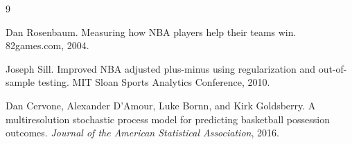 \documentclass[11pt]{article}
\begin{document}
\begin{thebibliography}{9}

Dan Rosenbaum.
\newblock Measuring how NBA players help their teams win.
\newblock 82games.com, 2004.

Joseph Sill.
\newblock Improved NBA adjusted plus-minus using regularization and
out-of-sample testing.
\newblock MIT Sloan Sports Analytics Conference, 2010.

Dan Cervone, Alexander D'Amour, Luke Bornn, and Kirk Goldsberry.
\newblock A multiresolution stochastic process model for predicting basketball
possession outcomes.
\newblock \emph{Journal of the American Statistical Association}, 2016.

\end{thebibliography}
\end{document}
